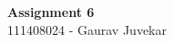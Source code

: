 \documentclass[main.tex]{subfiles}
\begin{document}
\begin{titlepage}

\begin{center}
  \LARGE{\bf{Assignment 6\\}}
  \horrule{0.4pt}
  111408024 - Gaurav Juvekar \\
\end{center}
\horrule{0.4pt}
\end{titlepage}
\end{document}
